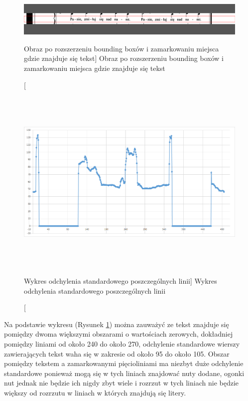 \documentclass[a4paper,12pt]{article}
\begin{document}
		        \begin{figure}[!ht]  
			        \begin{center}
				        \includegraphics[width=16.5cm, frame] {image//exampleImage//005_b.png} 
			        \end{center}
			        \caption
    			        [Obraz po rozszerzeniu bounding boxów i zamarkowaniu miejsca gdzie znajduje się tekst]  
    			        {Obraz po rozszerzeniu bounding boxów i zamarkowaniu miejsca gdzie znajduje się tekst}
		        \end{figure} 
		    \newpage
		        \begin{figure}[!ht]  
			        \begin{center}
				        \includegraphics[height=9cm, frame] {image//practicalPart//stdDevDetectText.png} 
			        \end{center}
			        \caption
        			    [Wykres odchylenia standardowego poszczególnych linii]  
        			    {Wykres odchylenia standardowego poszczególnych linii}  
        			    \label{fig:stdDevLineTex}
		        \end{figure}
		    
		    Na podstawie wykresu (Rysunek \ref{fig:stdDevLineTex}) można zauważyć ze tekst znajduje się pomiędzy dwoma większymi obszarami o wartościach zerowych, dokładniej pomiędzy liniami od około 240 do około 270, odchylenie standardowe wierszy zawierających tekst waha się w zakresie od około 95 do około 105. Obszar pomiędzy tekstem a zamarkowanymi pięcioliniami ma niezbyt duże odchylenie standardowe ponieważ mogą się w tych liniach znajdować nuty dodane, ogonki nut jednak nie będzie ich nigdy zbyt wiele i rozrzut w tych liniach nie będzie większy od rozrzutu w liniach w których znajdują się litery.
\end{document}
